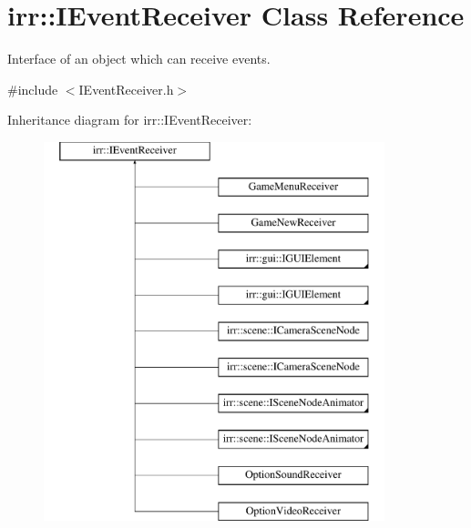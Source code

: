 \hypertarget{classirr_1_1IEventReceiver}{}\section{irr\+:\+:I\+Event\+Receiver Class Reference}
\label{classirr_1_1IEventReceiver}


Interface of an object which can receive events.  




{\ttfamily \#include $<$I\+Event\+Receiver.\+h$>$}

Inheritance diagram for irr\+:\+:I\+Event\+Receiver\+:\begin{figure}[H]
\begin{center}
\leavevmode
\includegraphics[height=11.000000cm]{classirr_1_1IEventReceiver}
\end{center}
\end{figure}
